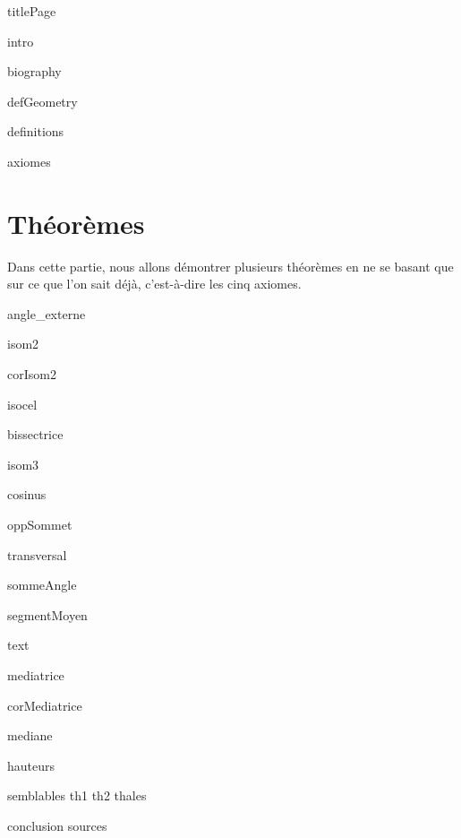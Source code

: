 \documentclass[a4paper,12pt]{article}
\begin{document}
{titlePage}

{intro}

{biography}

{defGeometry}



{definitions}

{axiomes}



\pagebreak
\section{Théorèmes}
Dans cette partie, nous allons démontrer plusieurs théorèmes en ne se basant que sur ce que l'on sait déjà, c'est-à-dire les cinq axiomes.

{angle_externe}

{isom2}

{corIsom2}

{isocel}

{bissectrice}

{isom3}

{cosinus}

{oppSommet}

{transversal}

{sommeAngle}

{segmentMoyen}

{text}

{mediatrice}
 
{corMediatrice}

{mediane}

{hauteurs}

{semblables}
{th1}
{th2}
{thales}



{conclusion}
{sources}


\label{Lastpage}
\end{document}
